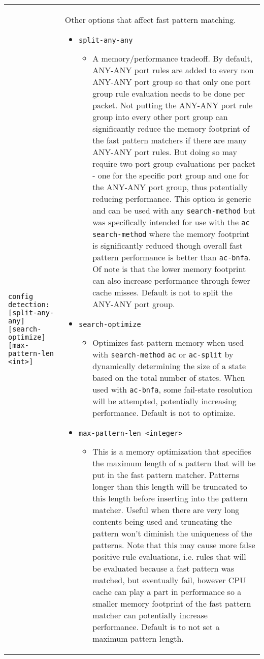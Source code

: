 \documentclass[english]{report}
\begin{document}
\begin{center}
\begin{longtable}[t]{| p{2.5in} | p{3.5in} |}
\hline
\texttt{config detection: [split-any-any] [search-optimize] [max-pattern-len <int>]} & Other options
that affect fast pattern matching.
\begin{itemize}
\item \texttt{split-any-any}
\begin{itemize}
\item A memory/performance tradeoff.  By default, ANY-ANY port rules are added to 
every non ANY-ANY port group so that only one port group rule evaluation needs to 
be done per packet.  Not putting the ANY-ANY port rule group into every other
port group can significantly reduce the memory footprint of the fast pattern
matchers if there are many ANY-ANY port rules.  But doing so may require two
port group evaluations per packet - one for the specific port group and one for
the ANY-ANY port group, thus potentially reducing performance.  This option is
generic and can be used with any \texttt{search-method} but was specifically
intended for use with the \texttt{ac} \texttt{search-method} where the memory
footprint is significantly reduced though overall fast pattern performance is
better than \texttt{ac-bnfa}.  Of note is that the lower memory footprint can
also increase performance through fewer cache misses.  Default is not to split
the ANY-ANY port group.
\end{itemize}
\item \texttt{search-optimize}
\begin{itemize}
\item Optimizes fast pattern memory when used with \texttt{search-method}
\texttt{ac} or \texttt{ac-split} by dynamically determining the size of a 
state based on the total number of states. When used with \texttt{ac-bnfa}, some
fail-state resolution will be attempted, potentially increasing performance.
Default is not to optimize.
\end{itemize}
\item \texttt{max-pattern-len <integer>}
\begin{itemize}
\item This is a memory optimization that specifies the maximum length of a pattern
that will be put in the fast pattern matcher.  Patterns longer than this length
will be truncated to this length before inserting into the pattern matcher.  Useful
when there are very long contents being used and truncating the pattern won't diminish
the uniqueness of the patterns.  Note that this may cause more false positive rule
evaluations, i.e. rules that will be evaluated because a fast pattern was matched,
but eventually fail, however CPU cache can play a part in performance so a smaller memory
footprint of the fast pattern matcher can potentially increase performance.  Default
is to not set a maximum pattern length.
\end{itemize}
\end{itemize} \\


\end{longtable}
\end{center}
\end{document}
